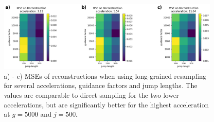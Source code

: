 \begin{figure}
    \centering
    \includegraphics[width=.7\textwidth]{images/globalresamplingmse.png}
    \caption[Reconstruction MSE with Long-Grained Resampling]{a) - c) MSEs of reconstructions when using long-grained resampling for several accelerations, guidance factors and jump lengths. The values are comparable to direct sampling for the two lower accelerations, but are significantly better for the highest acceleration at $g=5000$ and $j=500$.}
    \label{fig:mselonggrained}
\end{figure}
